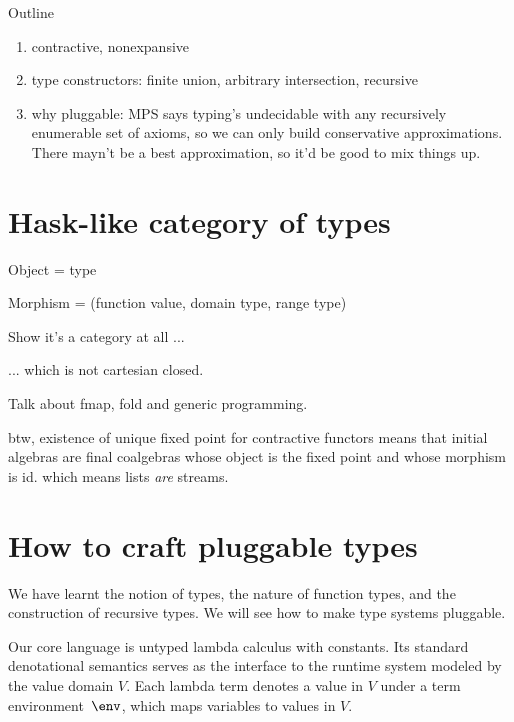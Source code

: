 \documentclass{amsart}
\begin{document}

Outline
\begin{enumerate}
\item contractive, nonexpansive
\item type constructors: finite union, arbitrary intersection,
recursive
\item why pluggable: MPS says typing's undecidable with any
recursively enumerable set of axioms, so we can only build
conservative approximations. There mayn't be a best
approximation, so it'd be good to mix things up.
\end{enumerate}


\section{Hask-like category of types}

\label{domain-theory-ends}

Object = type

Morphism = (function value, domain type, range type)

Show it's a category at all ...

... which is not cartesian closed.

Talk about fmap, fold and generic programming.

btw, existence of unique fixed point for contractive functors
means that initial algebras are final coalgebras whose object is
the fixed point and whose morphism is id. which means lists
\emph{are} streams.



\section{How to craft pluggable types}
\label{howto}

We have learnt the notion of types, the nature of function types,
and the construction of recursive types. We will see how to make
type systems pluggable.

Our core language is untyped lambda calculus with constants. Its
standard denotational semantics serves as the interface to the
runtime system modeled by the value domain $V$. Each lambda term
denotes a value in $V$ under a term environment~$\env$, which
maps variables to values in $V$.
\end{document}
